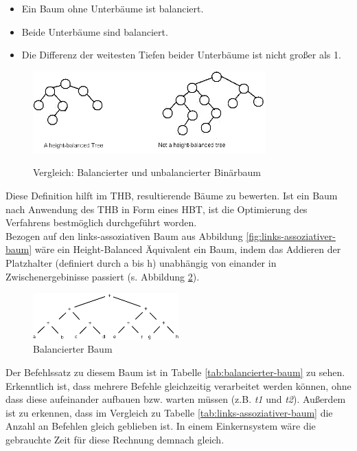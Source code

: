 \begin{itemize} 
	\item Ein Baum ohne Unterbäume ist balanciert.
	\item Beide Unterbäume sind balanciert. 
	\item Die Differenz der weitesten Tiefen beider Unterbäume ist nicht großer als 1. 
\end{itemize}

\begin{figure}
	\begin{center}
		\includegraphics[width=0.8\textwidth]{images/balanced_tree}\\
	\end{center}
	\caption{Vergleich: Balancierter und unbalancierter Binärbaum}
	\label{fig:vgl-hbt}
\end{figure}


Diese Definition hilft im THB, resultierende Bäume zu bewerten. Ist ein Baum nach Anwendung des THB in Form eines HBT, ist die Optimierung des Verfahrens bestmöglich durchgeführt worden.\\
Bezogen auf den links-assoziativen Baum aus Abbildung \ref{fig:links-assoziativer-baum}\cite{HeBIS-309344573} wäre ein Height-Balanced Äquivalent ein Baum, indem das Addieren der Platzhalter (definiert durch a bis h) unabhängig von einander in Zwischenergebinisse passiert (s. Abbildung \ref{fig:balancierter-baum}\cite{HeBIS-309344573}).\\

\begin{figure}
	\begin{center}
		\includegraphics[width=0.5\textwidth]{images/balanced}
	\end{center}
	\caption{Balancierter Baum}
	\label{fig:balancierter-baum}
\end{figure}

Der Befehlssatz zu diesem Baum ist in Tabelle \ref{tab:balancierter-baum} zu sehen. Erkenntlich ist, dass mehrere Befehle gleichzeitig verarbeitet werden können, ohne dass diese aufeinander aufbauen bzw. warten müssen (z.B. \textit{t1} und \textit{t2}). Außerdem ist zu erkennen, dass im Vergleich zu Tabelle \ref{tab:links-assoziativer-baum} die Anzahl an Befehlen gleich geblieben ist. In einem Einkernsystem wäre die gebrauchte Zeit für diese Rechnung demnach gleich.\\

